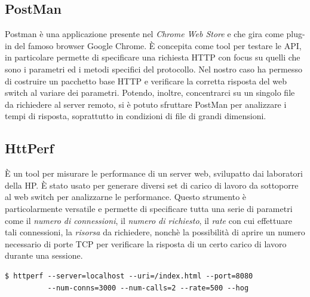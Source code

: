 \documentclass[italian]{tktltiki2}
\begin{document}
\subsection{PostMan}
Postman\cite{postman} è una applicazione presente nel \emph{Chrome Web Store} e che gira come plug-in del famoso browser Google Chrome. È concepita come tool per testare le API, in particolare permette di specificare una richiesta HTTP con focus su quelli che sono i parametri ed i metodi specifici del protocollo. Nel nostro caso ha permesso di costruire un pacchetto base HTTP e verificare la corretta risposta del web switch al variare dei parametri. Potendo, inoltre, concentrarci su un singolo file da richiedere al server remoto, si è potuto sfruttare PostMan per analizzare i tempi di risposta, soprattutto in condizioni di file di grandi dimensioni.
\subsection{HttPerf} \label{ssec: httperf}
È un tool per misurare le performance di un server web, svilupatto dai laboratori della HP\cite{httperf}. È stato usato per generare diversi set di carico di lavoro da sottoporre al web switch per analizzarne le performance. Questo strumento è particolarmente versatile e permette di specificare tutta una serie di parametri come il \emph{numero di connessioni}, il \emph{numero di richiesto}, il \emph{rate} con cui effettuare tali connessioni, la \emph{risorsa} da richiedere, nonchè la possibilità di aprire un numero necessario di porte TCP per verificare la risposta di un certo carico di lavoro durante una sessione.
\begin{lstlisting}
$ httperf --server=localhost --uri=/index.html --port=8080 
          --num-conns=3000 --num-calls=2 --rate=500 --hog

\end{lstlisting}
\end{document}
